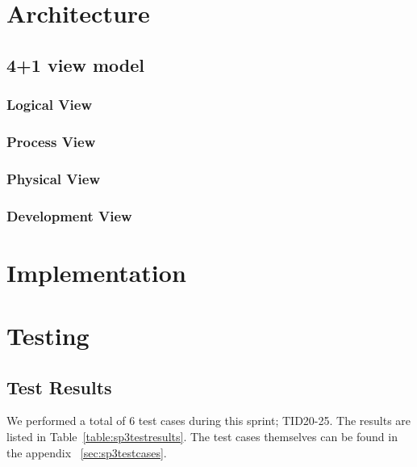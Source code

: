\section{Architecture}
\subsection{4+1 view model}
\subsubsection{Logical View}
\subsubsection{Process View}
\subsubsection{Physical View}
\subsubsection{Development View}


\section{Implementation}

\section{Testing}
\subsection{Test Results}
We performed a total of 6 test cases during this sprint; TID20-25. The results are listed in Table~\ref{table:sp3testresults}. The test cases themselves can be found in the appendix ~\ref{sec:sp3testcases}.

